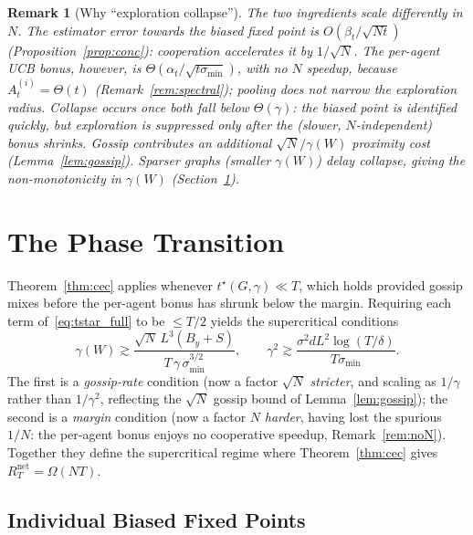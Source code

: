 \documentclass[11pt]{article}
\newtheorem*{remark}{Remark}
\begin{document}
\begin{remark}[Why ``exploration collapse'']\label{rem:mech}
The two ingredients scale differently in $N$.  The \emph{estimator
error} towards the biased fixed point is $O(\beta_t/\sqrt{Nt})$
(Proposition~\ref{prop:conc}): cooperation \emph{accelerates} it by
$1/\sqrt N$.  The per-agent \emph{UCB bonus}, however, is
$\Theta(\alpha_t/\sqrt{t\sigma_{\min}})$, with \emph{no} $N$ speedup,
because $A_t^{(i)}=\Theta(t)$ (Remark~\ref{rem:spectral}); pooling does
not narrow the exploration radius.  Collapse occurs once \emph{both}
fall below $\Theta(\gamma)$: the biased point is identified quickly,
but exploration is suppressed only after the (slower, $N$-independent)
bonus shrinks.  Gossip contributes an additional
$\sqrt N/\gamma(W)$ proximity cost (Lemma~\ref{lem:gossip}).  Sparser
graphs (smaller $\gamma(W)$) delay collapse, giving the non-monotonicity
in $\gamma(W)$ (Section~\ref{sec:phase}).
\end{remark}


\section{The Phase Transition}\label{sec:phase}

Theorem~\ref{thm:cec} applies whenever $t^\star(G,\gamma)\ll T$,
which holds provided gossip mixes before the per-agent bonus has shrunk
below the margin.  Requiring each term of~\eqref{eq:tstar_full} to be
$\leq T/2$ yields the supercritical conditions
\begin{equation}
\gamma(W)\gtrsim\frac{\sqrt{N}\,L^3(B_y+S)}{T\,\gamma\,\sigma_{\min}^{3/2}},\qquad
\gamma^2\gtrsim\frac{\sigma^2 dL^2\log(T/\delta)}{T\sigma_{\min}}.
\label{eq:phase}
\end{equation}
The first is a \emph{gossip-rate} condition (now a factor $\sqrt N$
\emph{stricter}, and scaling as $1/\gamma$ rather than $1/\gamma^2$,
reflecting the $\sqrt N$ gossip bound of Lemma~\ref{lem:gossip}); the
second is a \emph{margin} condition (now a factor $N$ \emph{harder},
having lost the spurious $1/N$: the per-agent bonus enjoys no
cooperative speedup, Remark~\ref{rem:noN}).  Together they define the
supercritical regime where Theorem~\ref{thm:cec} gives
$R_T^{\mathrm{net}}=\Omega(NT)$.

\subsection{Individual Biased Fixed Points}\label{sec:indiv}
\end{document}
